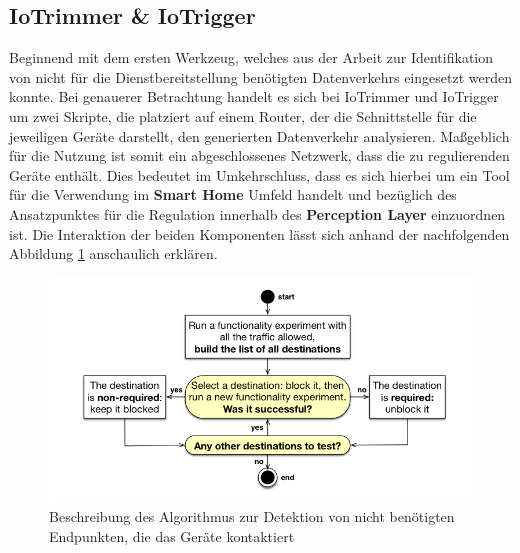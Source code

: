 \subsection{IoTrimmer \& IoTrigger}
\label{sec:Regulationsmöglichkeiten:ssec:IoTrimmer und IoTrigger}

Beginnend mit dem ersten Werkzeug, welches aus der Arbeit \cite{Mandalari2021} zur Identifikation von nicht für die Dienstbereitstellung benötigten Datenverkehrs eingesetzt werden konnte. Bei genauerer Betrachtung handelt es sich bei IoTrimmer und IoTrigger \cite{Mandalari2021} um zwei Skripte, die platziert auf einem Router, der die Schnittstelle für die jeweiligen Geräte darstellt, den generierten Datenverkehr analysieren. 
Maßgeblich für die Nutzung ist somit ein abgeschlossenes Netzwerk, dass die zu regulierenden Geräte enthält. Dies bedeutet im Umkehrschluss, dass es sich hierbei um ein Tool für die Verwendung im \textbf{Smart Home} Umfeld handelt und bezüglich des Ansatzpunktes für die Regulation innerhalb des \textbf{Perception Layer} einzuordnen ist.
Die Interaktion der beiden Komponenten lässt sich anhand der nachfolgenden Abbildung \ref{fig:iotrigger-iotrimmer} anschaulich erklären.

\begin{figure}
    \centering
    \includegraphics[width=\textwidth]{main/countermeasures/pictures/Identification_Non_Essential_Traffic}
    \caption{Beschreibung des Algorithmus zur Detektion von nicht benötigten Endpunkten, die das Geräte kontaktiert \cite{Mandalari2021}}
    \label{fig:iotrigger-iotrimmer}
\end{figure}

